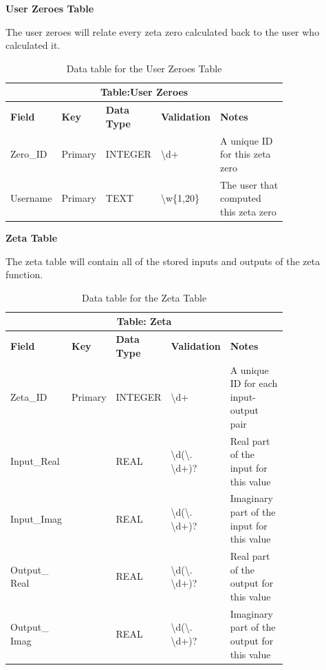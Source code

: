 \documentclass{article}
\begin{document}
\clearpage
\textbf{User Zeroes Table}

The user zeroes will relate every zeta zero calculated back to the user who calculated it.

\begin{table}[ht]
    \centering
    \begin{tabular}{ | p{0.15\linewidth} | p{0.1\linewidth} | p{0.16\linewidth} | p{0.14\linewidth} | p{0.25\linewidth} | }
    \hline
    \multicolumn{5}{|c|}{\textbf{Table:User Zeroes}}\\
    \hline
    \hline
    \textbf{Field} & \textbf{Key} & \textbf{Data Type} & \textbf{Validation} & \textbf{Notes} \\
    \hline
    Zero\_ID & Primary & INTEGER & \textbackslash d+ & A unique ID for this zeta zero\\
    \hline
    Username & Primary & TEXT & \textbackslash w\{1,20\}& The user that computed this zeta zero\\
    \hline
    \end{tabular}
    \caption{Data table for the User Zeroes Table}
\end{table}


\textbf{Zeta Table}

The zeta table will contain all of the stored inputs and outputs of the zeta function.

\begin{table}[ht]
    \centering
    \begin{tabular}{ | p{0.15\linewidth} | p{0.1\linewidth} | p{0.16\linewidth} | p{0.14\linewidth} | p{0.25\linewidth} | }
    \hline
    \multicolumn{5}{|c|}{\textbf{Table: Zeta}}\\
    \hline
    \hline
    \textbf{Field} & \textbf{Key} & \textbf{Data Type} & \textbf{Validation} & \textbf{Notes} \\
    \hline
    Zeta\_ID & Primary & INTEGER & \textbackslash d+ & A unique ID for each input-output pair\\
    \hline
    Input\_Real & & REAL & \textbackslash d(\textbackslash. \textbackslash d+)? & Real part of the input for this value\\
    \hline
    Input\_Imag & & REAL & \textbackslash d(\textbackslash. \textbackslash d+)? & Imaginary part of the input for this value\\
    \hline
    Output\_ Real & & REAL & \textbackslash d(\textbackslash. \textbackslash d+)? & Real part of the output for this value\\
    \hline
    Output\_ Imag & & REAL & \textbackslash d(\textbackslash. \textbackslash d+)? & Imaginary part of the output for this value\\
    \hline
    \end{tabular}
    \caption{Data table for the Zeta Table}
\end{table}
\end{document}
